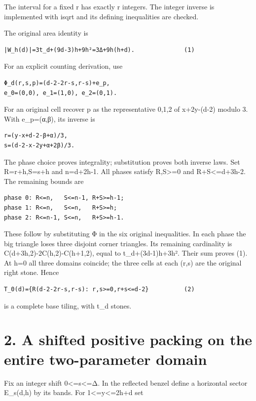 \documentclass[
  10pt,
]{scrreprt}
\begin{document}
The interval for a fixed r has exactly r integers. The integer inverse
is implemented with isqrt and its defining inequalities are checked.

The original area identity is

\begin{verbatim}
|W_h(d)|=3t_d+(9d-3)h+9h²=3Δ+9h(h+d).              (1)
\end{verbatim}

For an explicit counting derivation, use

\begin{verbatim}
Φ_d(r,s,p)=(d-2-2r-s,r-s)+e_p,
e_0=(0,0), e_1=(1,0), e_2=(0,1).
\end{verbatim}

For an original cell recover p as the representative 0,1,2 of x+2y-(d-2)
modulo 3. With e\_p=(α,β), its inverse is

\begin{verbatim}
r=(y-x+d-2-β+α)/3,
s=(d-2-x-2y+α+2β)/3.
\end{verbatim}

The phase choice proves integrality; substitution proves both inverse
laws. Set R=r+h,S=s+h and n=d+2h-1. All phases satisfy R,S\textgreater=0
and R+S\textless=d+3h-2. The remaining bounds are

\begin{verbatim}
phase 0: R<=n,   S<=n-1, R+S>=h-1;
phase 1: R<=n,   S<=n,   R+S>=h;
phase 2: R<=n-1, S<=n,   R+S>=h-1.
\end{verbatim}

These follow by substituting Φ in the six original inequalities. In each
phase the big triangle loses three disjoint corner triangles. Its
remaining cardinality is C(d+3h,2)-2C(h,2)-C(h+1,2), equal to
t\_d+(3d-1)h+3h². Their sum proves (1). At h=0 all three domains
coincide; the three cells at each (r,s) are the original right stone.
Hence

\begin{verbatim}
T_0(d)={R(d-2-2r-s,r-s): r,s>=0,r+s<=d-2}          (2)
\end{verbatim}

is a complete base tiling, with t\_d stones.

\section{2. A shifted positive packing on the entire two-parameter
domain}\label{edition-10-section-2}

Fix an integer shift 0\textless=s\textless=Δ. In the reflected benzel
define a horizontal sector E\_s(d,h) by its bands. For
1\textless=y\textless=2h+d set
\end{document}
